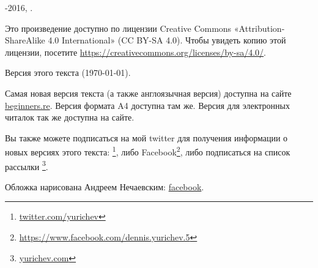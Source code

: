﻿\begin{titlepage}


\end{titlepage}

\newpage

\begin{center}
\vspace*{\fill}
{\LARGE \TITLE}

\vspace*{\fill}

{\large \AUTHOR}

{\large \TT{<\EMAIL>}}
\vspace*{\fill}
\vfill

\ccbysa

-2016, \AUTHOR. 

Это произведение доступно по лицензии Creative Commons «Attribution-ShareAlike 4.0 International» (CC BY-SA 4.0).
Чтобы увидеть копию этой лицензии, посетите \url{https://creativecommons.org/licenses/by-sa/4.0/}.

Версия этого текста ({\large \today}).

Самая новая версия текста (а также англоязычная версия) доступна на сайте \href{http://go.yurichev.com/17009}{beginners.re}.
\ifdefined\ebook
Версия формата A4 доступна там же.
\else
Версия для электронных читалок так же доступна на сайте.
\fi

Вы также можете подписаться на мой twitter для получения информации о новых версиях этого текста:
\footnote{\href{http://go.yurichev.com/17021}{twitter.com/yurichev}},
либо Facebook\footnote{\url{https://www.facebook.com/dennis.yurichev.5}},
либо подписаться на список рассылки
\footnote{\href{http://go.yurichev.com/17020}{yurichev.com}}.

Обложка нарисована Андреем Нечаевским: \href{http://go.yurichev.com/17023}{facebook}.

\end{center}
